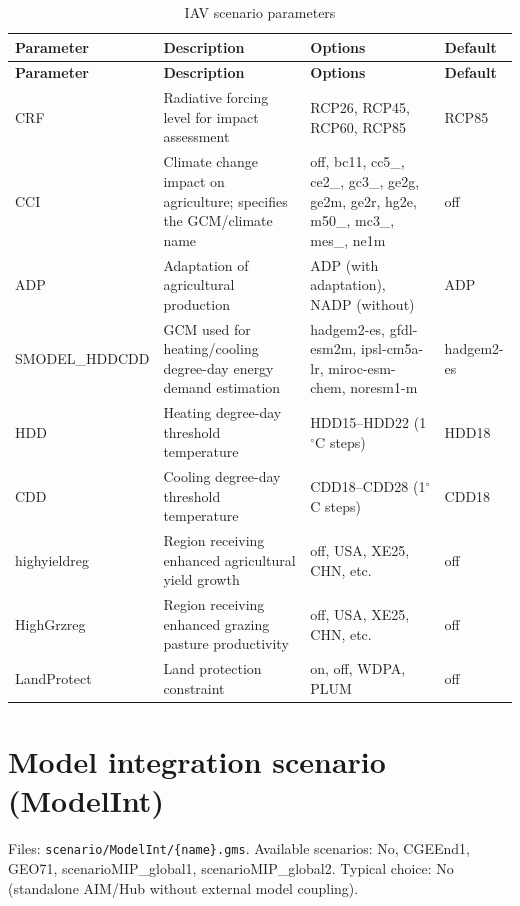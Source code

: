 \documentclass[10pt,a4paper,titlepage,dvipdfmx]{book}
\begin{document}
\begin{longtable}{|p{}|p{}|p{}|p{}|}
\caption{IAV scenario parameters}\label{tab:sp-iav}\\
\hline
\textbf{Parameter} & \textbf{Description} & \textbf{Options} & \textbf{Default} \\ \hline
\endfirsthead
\hline
\textbf{Parameter} & \textbf{Description} & \textbf{Options} & \textbf{Default} \\ \hline
\endhead
\hline
\endfoot
CRF & Radiative forcing level for impact assessment & RCP26, RCP45, RCP60, RCP85 & RCP85 \\ \hline
CCI & Climate change impact on agriculture; specifies the GCM/climate name & off, bc11, cc5\_, ce2\_, gc3\_, ge2g, ge2m, ge2r, hg2e, m50\_, mc3\_, mes\_, ne1m & off \\ \hline
ADP & Adaptation of agricultural production & ADP (with adaptation), NADP (without) & ADP \\ \hline
SMODEL\_HDDCDD & GCM used for heating/cooling degree-day energy demand estimation & hadgem2-es, gfdl-esm2m, ipsl-cm5a-lr, miroc-esm-chem, noresm1-m & hadgem2-es \\ \hline
HDD & Heating degree-day threshold temperature & HDD15--HDD22 (1$^\circ$C steps) & HDD18 \\ \hline
CDD & Cooling degree-day threshold temperature & CDD18--CDD28 (1$^\circ$C steps) & CDD18 \\ \hline
highyieldreg & Region receiving enhanced agricultural yield growth & off, USA, XE25, CHN, etc. & off \\ \hline
HighGrzreg & Region receiving enhanced grazing pasture productivity & off, USA, XE25, CHN, etc. & off \\ \hline
LandProtect & Land protection constraint & on, off, WDPA, PLUM & off \\ \hline
\end{longtable}

\section{Model integration scenario (ModelInt)}

Files: \texttt{scenario/ModelInt/\{name\}.gms}. Available scenarios: No,
CGEEnd1, GEO71, scenarioMIP\_global1, scenarioMIP\_global2. Typical choice: No
(standalone AIM/Hub without external model coupling).
\end{document}
